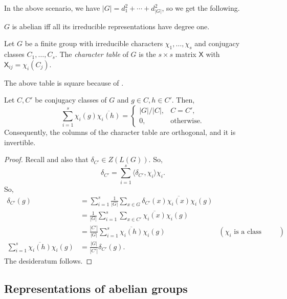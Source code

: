 		In the above scenario, we have $|G| = d_1^2 + \cdots + d_{|G|}^2$, so we get the following.

		\begin{fcor}
			\label{cor: abelian iff irred degree one}
			$G$ is abelian iff all its irreducible representations have degree one.
		\end{fcor}


		\begin{fdef}
			Let $G$ be a finite group with irreducible characters $\chi_1,\ldots,\chi_s$ and conjugacy classes $C_1,\ldots,C_s$. The \emph{character table} of $G$ is the $s \times s$ matrix $\mathsf{X}$ with $\mathsf{X}_{ij} = \chi_i(C_j)$.
		\end{fdef}

		The above table is square because of .

		\begin{fprop}
			Let $C,C'$ be conjugacy classes of $G$ and $g \in C, h \in C'$. Then,
			\[ \sum_{i=1}^s \chi_i(g) \overline{\chi_i(h)} = \begin{cases} |G|/|C| , & C = C', \\ 0, & \text{otherwise.} \end{cases} \]
			Consequently, the columns of the character table are orthogonal, and it is invertible.
		\end{fprop}
		\begin{proof}
			Recall  and also that $\delta_{C'} \in Z(L(G))$. So,
			\[ \delta_{C'} = \sum_{i=1}^s \langle \delta_{C'} , \chi_i \rangle \chi_i. \]
			So,
			\begin{align*}
				\delta_{C'}(g) &= \sum_{i=1}^s \frac{1}{|G|} \sum_{x \in G} \delta_{C'}(x) \overline{\chi_i(x)} \chi_i(g) \\
					&= \frac{1}{|G|} \sum_{i=1}^s \sum_{x \in C'} \overline{\chi_i(x)} \chi_i(g) \\
					&= \frac{|C'|}{|G|} \sum_{i=1}^s \overline{\chi_i(h)} \chi_i(g) & (\chi_i \text{ is a class function}) \\
				\sum_{i=1}^s \overline{\chi_i(h)} \chi_i(g) &= \frac{|G|}{|C'|} \delta_{C'}(g).
			\end{align*}
			The desideratum follows.
		\end{proof}

	\subsection{Representations of abelian groups}

